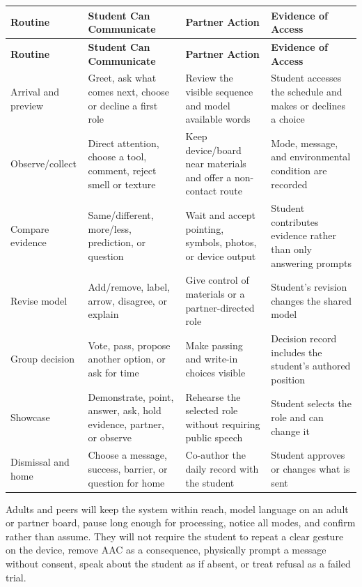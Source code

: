 \documentclass[11pt]{article}
\newcommand{\reviewsection}[1]{%
  \Needspace{4\baselineskip}
  \vspace{0.08in}\noindent{\normalsize\bfseries\color{PrimaryRed}#1}
  \par\vspace{0.025in}
}
\newcommand{\tableheaderfour}[4]{%
  \rowcolor{PrimaryRed}
  \color{white}\bfseries #1 &
  \color{white}\bfseries #2 &
  \color{white}\bfseries #3 &
  \color{white}\bfseries #4 \\
}
\begin{document}
\small
\setlength{\tabcolsep}{4pt}
\begin{longtable}{>{\RaggedRight\arraybackslash}p{0.95in} >{\RaggedRight\arraybackslash}p{1.85in} >{\RaggedRight\arraybackslash}p{2.05in} >{\RaggedRight\arraybackslash}p{1.75in}}
\tableheaderfour{Routine}{Student Can Communicate}{Partner Action}{Evidence of Access}
\endfirsthead
\tableheaderfour{Routine}{Student Can Communicate}{Partner Action}{Evidence of Access}
\endhead
Arrival and preview & Greet, ask what comes next, choose or decline a first role & Review the visible sequence and model available words & Student accesses the schedule and makes or declines a choice \\
\rowcolor{SoftGray}
Observe/collect & Direct attention, choose a tool, comment, reject smell or texture & Keep device/board near materials and offer a non-contact route & Mode, message, and environmental condition are recorded \\
Compare evidence & Same/different, more/less, prediction, or question & Wait and accept pointing, symbols, photos, or device output & Student contributes evidence rather than only answering prompts \\
\rowcolor{SoftGray}
Revise model & Add/remove, label, arrow, disagree, or explain & Give control of materials or a partner-directed role & Student's revision changes the shared model \\
Group decision & Vote, pass, propose another option, or ask for time & Make passing and write-in choices visible & Decision record includes the student's authored position \\
\rowcolor{SoftGray}
Showcase & Demonstrate, point, answer, ask, hold evidence, partner, or observe & Rehearse the selected role without requiring public speech & Student selects the role and can change it \\
Dismissal and home & Choose a message, success, barrier, or question for home & Co-author the daily record with the student & Student approves or changes what is sent \\
\end{longtable}
\normalsize

\reviewsection{Communication Partner Plan}

Adults and peers will keep the system within reach, model language on an adult or partner board, pause long enough for processing, notice all modes, and confirm rather than assume. They will not require the student to repeat a clear gesture on the device, remove AAC as a consequence, physically prompt a message without consent, speak about the student as if absent, or treat refusal as a failed trial.
\end{document}
